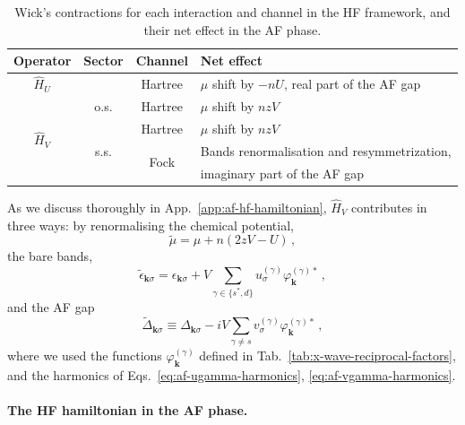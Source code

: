\begin{table}[t]
	\centering
	\begin{tabular}{c c c l}
		\textbf{Operator} & \textbf{Sector} & \textbf{Channel} & \textbf{Net effect} \\
		\midrule
		$\hat H_U$ && Hartree & $\mu$ shift by $-nU$, real part of the AF gap \\
		\midrule
		\multirow{4}{*}{$\hat H_V$} & o.s. & Hartree & $\mu$ shift by $nzV$ \\[0.5em]
		& \multirow{3}{*}{s.s.} & Hartree & $\mu$ shift by $nzV$\\
		&& \multirow{2}{*}{Fock} & Bands renormalisation and resymmetrization,\\
		& & & imaginary part of the AF gap \\
		\midrule
	\end{tabular}
	\caption{Wick's contractions for each interaction and channel in the HF framework, and their net effect in the AF phase.}
	\label{tab:af-RWCs}
\end{table}

As we discuss thoroughly in App.~\ref{app:af-hf-hamiltonian}, $\hat H_V$ contributes in three ways: by renormalising the chemical potential,
\begin{equation}\label{eq:af-mu-shift}
	\tilde{\mu} = \mu + n(2zV-U) \, ,
\end{equation}
the bare bands,
\begin{equation}\label{eq:af-ehm-full-bands}
	\tilde{\epsilon}_{\mathbf{k}\sigma} = \epsilon_{\mathbf{k}\sigma} + V \sum_{\gamma\in\lbrace s^*,d \rbrace} u^{(\gamma)}_\sigma \varphi_{\mathbf{k}}^{(\gamma)*} \, ,
\end{equation}
and the AF gap
\begin{equation}\label{eq:af-ehm-full-gap}
	\tilde{\Delta}_{\mathbf{k}\sigma} \equiv \Delta_{\mathbf{k}\sigma} - iV \sum_{\gamma \neq s} v^{(\gamma)}_\sigma \varphi_\mathbf{k}^{(\gamma)*} \, ,
\end{equation}
where we used the functions $\varphi_\mathbf{k}^{(\gamma)}$ defined in Tab.~\ref{tab:x-wave-reciprocal-factors}, and the harmonics of Eqs.~\eqref{eq:af-ugamma-harmonics}, \eqref{eq:af-vgamma-harmonics}.

\paragraph{The HF hamiltonian in the AF phase.}

